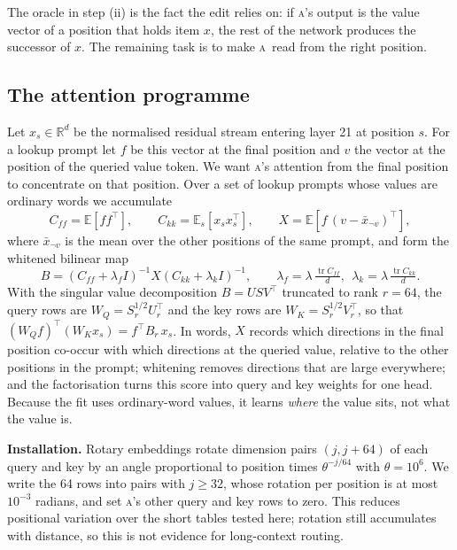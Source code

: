 \documentclass[11pt]{article}
\newcommand{\A}{\textsc{a}}
\begin{document}
The oracle in step (ii) is the fact the edit relies on: if \A's output is the value vector of a position that holds item $x$, the rest of the network produces the successor of $x$. The remaining task is to make \A\ read from the right position.

\subsection{The attention programme}\label{sec:program}

Let $x_s \in \mathbb{R}^d$ be the normalised residual stream entering layer 21 at position $s$. For a lookup prompt let $f$ be this vector at the final position and $v$ the vector at the position of the queried value token. We want \A's attention from the final position to concentrate on that position. Over a set of lookup prompts whose values are ordinary words we accumulate
\begin{equation}
C_{ff} = \mathbb{E}\!\left[f f^{\top}\right],\qquad
C_{kk} = \mathbb{E}_s\!\left[x_s x_s^{\top}\right],\qquad
X = \mathbb{E}\!\left[f\,(v - \bar{x}_{\neg v})^{\top}\right],
\end{equation}
where $\bar{x}_{\neg v}$ is the mean over the other positions of the same prompt, and form the whitened bilinear map
\begin{equation}
B = \left(C_{ff} + \lambda_f I\right)^{-1} X \left(C_{kk} + \lambda_k I\right)^{-1},\qquad \lambda_f = \lambda\,\tfrac{\operatorname{tr} C_{ff}}{d},\ \ \lambda_k = \lambda\,\tfrac{\operatorname{tr} C_{kk}}{d}.
\end{equation}
With the singular value decomposition $B = U S V^{\top}$ truncated to rank $r = 64$, the query rows are $W_Q = S_r^{1/2} U_r^{\top}$ and the key rows are $W_K = S_r^{1/2} V_r^{\top}$, so that $(W_Q f)^{\top}(W_K x_s) = f^{\top} B_r\, x_s$. In words, $X$ records which directions in the final position co-occur with which directions at the queried value, relative to the other positions in the prompt; whitening removes directions that are large everywhere; and the factorisation turns this score into query and key weights for one head. Because the fit uses ordinary-word values, it learns \emph{where} the value sits, not what the value is.

\textbf{Installation.} Rotary embeddings rotate dimension pairs $(j, j{+}64)$ of each query and key by an angle proportional to position times $\theta^{-j/64}$ with $\theta = 10^6$. We write the 64 rows into pairs with $j \ge 32$, whose rotation per position is at most $10^{-3}$ radians, and set \A's other query and key rows to zero. This reduces positional variation over the short tables tested here; rotation still accumulates with distance, so this is not evidence for long-context routing.
\end{document}
